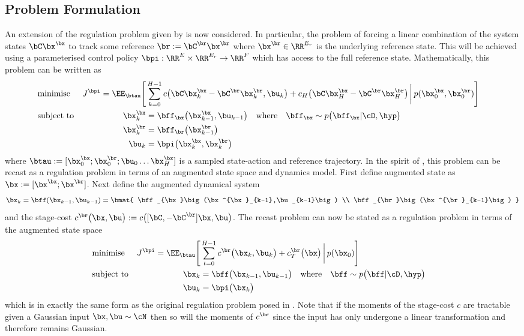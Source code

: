 \subsection{Problem Formulation}
An extension of the regulation problem given by  is now considered. In particular, the problem of forcing a linear combination of the system states $\bC\bx^{\bx}$ to track some reference $\br := \bC^{\br}\bx^{\br}$ where $\bx^{\br} \in \RR^{E_r}$ is the underlying reference state. This will be achieved using a parameterised control policy $\bpi: \RR^{E} \times \RR^{E_r} \rightarrow \RR^F$ which has access to the full reference state.   Mathematically, this problem can be written as
\begin{align}
& \text{minimise} & J^{\bpi} = \EE_{\btau}\Bigg[ & \sum_{k=0}^{H-1} c\big(\bC\bx^{\bx}_k - \bC^{\br}\bx^{\br}_k,\bu_k\big) + c_H\big(\bC\bx^{\bx}_H - \bC^{\br}\bx^{\br}_H\big) \, \bigg| \, p(\bx^{\bx}_0, \bx^{\br}_0) \Bigg]
\label{eqn:reftrack1} \\
&\text{subject to} & \bx^{\bx}_k &= \bff_{\bx}\big(\bx^{\bx}_{k-1},\bu_{k-1}\big) 
\quad \text{where} \quad \bff_{\bx} \sim p\big(\bff_{\bx}|\cD,\hyp\big) & \label{eqn:reftrack2}\\
\nonumber && \bx^{\br}_k &= \bff_{\br}\big(\bx^{\br}_{k-1}\big) \\
\nonumber && \bu_k &= \bpi\big(\bx^{\bx}_k, \bx^{\br}_k \big)
\end{align}
where $\btau := [\bx^{\bx}_0; \bx^{\br}_0; \bu_0 \dots \bx^{\bx}_H]$ is a sampled state-action and reference trajectory. In the spirit of \cite{BGW90}, this problem can be recast as a regulation problem in terms of an augmented state space and dynamics model. First define augmented state as $\bx := [\bx^{\bx}; \bx^{\br}]$. Next define the augmented dynamical system
\begin{equation*}
\bx_{k} =
\bff(\bx_{k-1}, \bu_{k-1}) = \bmat{
\bff_{\bx}\big(\bx^{\bx}_{k-1},\bu_{k-1}\big) \\
\bff_{\br}\big(\bx^{\br}_{k-1}\big)
}
\end{equation*}
and the stage-cost $c^{\br}\big(\bx,\bu\big) := c\big([\bC, -\bC^{\br}]\bx,\bu\big)$. The recast problem can now be stated as a regulation problem in terms of the augmented state space
\begin{align}
& \text{minimise} & J^{\bpi} = \EE_{\btau}\Bigg[ & \sum_{t=0}^{H-1} c^{\br}\big(\bx_k ,\bu_k \big) + c^{\br}_T\big(\bx\big) \, \bigg| \, p(\bx_0) \Bigg]
 \\
&\text{subject to} & \bx_k &= \bff\big(\bx_{k-1},\bu_{k-1}\big) 
\quad \text{where} \quad \bff \sim p\big(\bff|\cD,\hyp\big) & \\
\nonumber && \bu_k &= \bpi\big( \bx_k \big)
\end{align}
which is in exactly the same form as the original regulation problem posed in . Note that if the moments of the stage-cost $c$ are tractable given a Gaussian input $\bx,\bu \sim \cN$ then so will the moments of $c^{\br}$ since the input has only undergone a linear transformation and therefore remains Gaussian.


